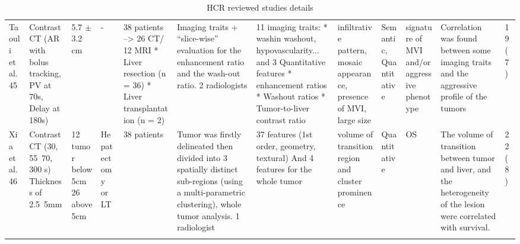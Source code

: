 \begin{landscape}
\begin{longtable}{p{2cm}|p{1.5cm}p{1cm}p{2cm}p{2cm}p{2cm}p{2cm}p{2cm}p{2cm}p{1.5cm}p{2cm}p{1cm}}
Taouli et al.  45 &Contrast CT (AR with bolus tracking, PV at 70s, Delay at 180s) &5.7 $ \pm $ 3.2 cm &- &38 patients --> 26 CT/ 12 MRI * Liver resection (n = 36) * Liver transplantation (n = 2) &Imaging traits + “slice-wise” evaluation for the enhancement ratio and the wash-out ratio. 2 radiologists &11 imaging traits: * washin washout, hypovascularity... and 3 Quantitative features * enhancement ratios * Washout ratios * Tumor-to-liver contrast ratio &infiltrative pattern, mosaic appearance, presence of MVI, large size &Semantic, Quantitative &signature of MVI and/or aggressive phenotype &Correlation was found between some imaging traits and the aggressive profile of the tumors &19 (7) \\
Xia et al.  46 &Contrast CT (30, 55~70, 300 s) Thickness of 2.5~5mm &12 tumor below 5cm 26 above 5cm &Hepatectomy or LT &38 patients &Tumor was firstly delineated then divided into 3 spatially distinct sub-regions (using a multi-parametric clustering), whole tumor analysis. 1 radiologist &37 features (1st order, geometry, textural) And 4 features for the whole tumor &volume of transition region and cluster prominence &Quantitative &OS &The volume of transition between tumor and liver, and the heterogeneity of the lesion were correlated with survival. &22 (8) \\
\caption{HCR reviewed studies details}\label{tab:HCR_studies_details}
\end{longtable}

\end{landscape}
\renewcommand{\arraystretch}{5}
